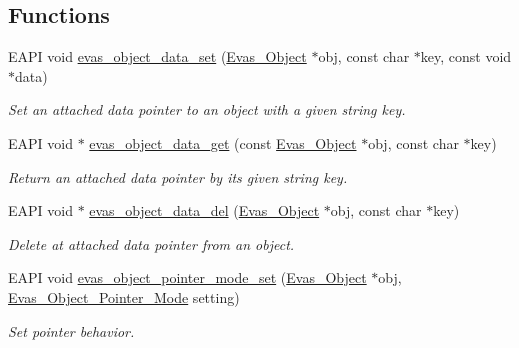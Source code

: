 \subsection*{Functions}
\begin{DoxyCompactItemize}
\item 
EAPI void \hyperlink{group__Evas__Object__Group__Extras_ga429f41f49547080ff96d21196e4ff8ed}{evas\_\-object\_\-data\_\-set} (\hyperlink{group__Evas__Object__Group_ga9e19e6dd1f517a0ba437c0114d3e7c97}{Evas\_\-Object} $\ast$obj, const char $\ast$key, const void $\ast$data)
\begin{DoxyCompactList}\small\item\em Set an attached data pointer to an object with a given string key. \item\end{DoxyCompactList}\item 
EAPI void $\ast$ \hyperlink{group__Evas__Object__Group__Extras_ga69bba3a6ae917a3170ec4429d6b86f0b}{evas\_\-object\_\-data\_\-get} (const \hyperlink{group__Evas__Object__Group_ga9e19e6dd1f517a0ba437c0114d3e7c97}{Evas\_\-Object} $\ast$obj, const char $\ast$key)
\begin{DoxyCompactList}\small\item\em Return an attached data pointer by its given string key. \item\end{DoxyCompactList}\item 
EAPI void $\ast$ \hyperlink{group__Evas__Object__Group__Extras_ga163e7d373168eea15ef1b6a9be68f3ec}{evas\_\-object\_\-data\_\-del} (\hyperlink{group__Evas__Object__Group_ga9e19e6dd1f517a0ba437c0114d3e7c97}{Evas\_\-Object} $\ast$obj, const char $\ast$key)
\begin{DoxyCompactList}\small\item\em Delete at attached data pointer from an object. \item\end{DoxyCompactList}\item 
EAPI void \hyperlink{group__Evas__Object__Group__Extras_ga5504e39f8d0cc41af3663fed15ec06e5}{evas\_\-object\_\-pointer\_\-mode\_\-set} (\hyperlink{group__Evas__Object__Group_ga9e19e6dd1f517a0ba437c0114d3e7c97}{Evas\_\-Object} $\ast$obj, \hyperlink{group__Evas__Object__Group__Extras_ga27baac4c63b590de109e3e3f0d941483}{Evas\_\-Object\_\-Pointer\_\-Mode} setting)
\begin{DoxyCompactList}\small\item\em Set pointer behavior. \item\end{DoxyCompactList}\item 

\end{DoxyCompactItemize}
